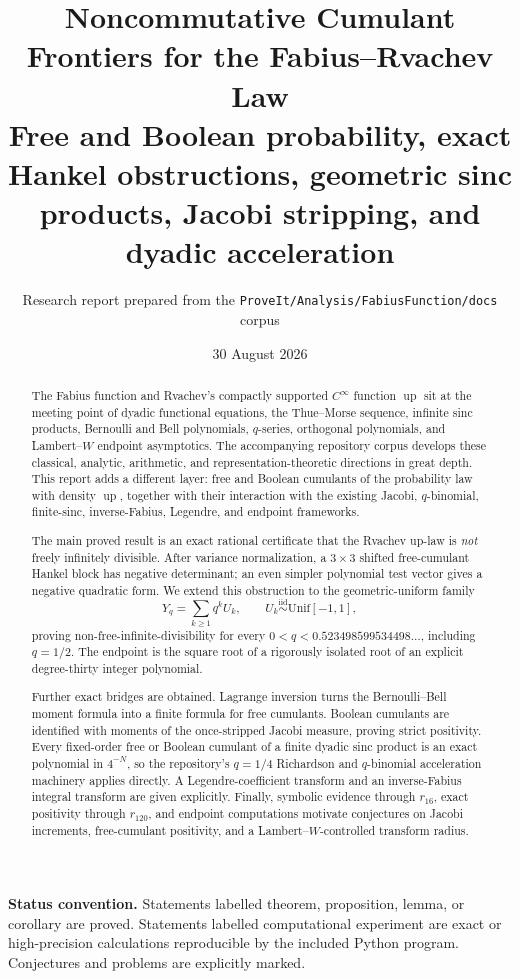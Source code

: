 \documentclass[11pt]{article}
\title{\bfseries Noncommutative Cumulant Frontiers for the Fabius--Rvachev Law\\[0.4em]
\large Free and Boolean probability, exact Hankel obstructions, geometric sinc products, Jacobi stripping, and dyadic acceleration}
\author{Research report prepared from the \texttt{ProveIt/Analysis/FabiusFunction/docs} corpus}
\date{30 August 2026}
\theoremstyle{definition}
\newcommand{\Up}{\operatorname{up}}
\begin{document}
\maketitle
\begin{abstract}
The Fabius function and Rvachev's compactly supported \(C^\infty\) function \(\Up\) sit at the meeting point of dyadic functional equations, the Thue--Morse sequence, infinite sinc products, Bernoulli and Bell polynomials, \(q\)-series, orthogonal polynomials, and Lambert--\(W\) endpoint asymptotics. The accompanying repository corpus develops these classical, analytic, arithmetic, and representation-theoretic directions in great depth. This report adds a different layer: free and Boolean cumulants of the probability law with density \(\Up\), together with their interaction with the existing Jacobi, \(q\)-binomial, finite-sinc, inverse-Fabius, Legendre, and endpoint frameworks.

The main proved result is an exact rational certificate that the Rvachev up-law is \emph{not} freely infinitely divisible. After variance normalization, a \(3\times3\) shifted free-cumulant Hankel block has negative determinant; an even simpler polynomial test vector gives a negative quadratic form. We extend this obstruction to the geometric-uniform family
\[
Y_q=\sum_{k\ge1}q^kU_k,\qquad U_k\stackrel{\mathrm{iid}}\sim \mathrm{Unif}[-1,1],
\]
proving non-free-infinite-divisibility for every \(0<q<0.523498599534498\ldots\), including \(q=1/2\). The endpoint is the square root of a rigorously isolated root of an explicit degree-thirty integer polynomial.

Further exact bridges are obtained. Lagrange inversion turns the Bernoulli--Bell moment formula into a finite formula for free cumulants. Boolean cumulants are identified with moments of the once-stripped Jacobi measure, proving strict positivity. Every fixed-order free or Boolean cumulant of a finite dyadic sinc product is an exact polynomial in \(4^{-N}\), so the repository's \(q=1/4\) Richardson and \(q\)-binomial acceleration machinery applies directly. A Legendre-coefficient transform and an inverse-Fabius integral transform are given explicitly. Finally, symbolic evidence through \(r_{16}\), exact positivity through \(r_{120}\), and endpoint computations motivate conjectures on Jacobi increments, free-cumulant positivity, and a Lambert--\(W\)-controlled transform radius.
\end{abstract}

\noindent\textbf{Status convention.}
Statements labelled theorem, proposition, lemma, or corollary are proved. Statements labelled computational experiment are exact or high-precision calculations reproducible by the included Python program. Conjectures and problems are explicitly marked.
\end{document}
